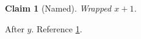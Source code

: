 \documentclass{article}
\newtheorem{claim}{Claim}
\begin{document}
\begin{claim}[Named]\label{claim:wrapped}Wrapped $x+1$.\end{claim}
After $y$. Reference \ref{claim:wrapped}.
\end{document}
